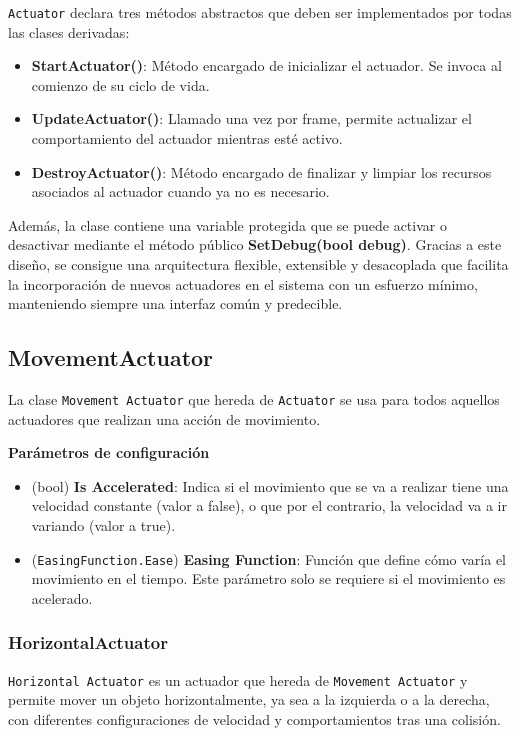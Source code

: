 \texttt{Actuator} declara tres métodos abstractos que deben ser implementados por todas las clases derivadas:

\begin{itemize}
\item \textbf{StartActuator()}: Método encargado de inicializar el actuador. Se invoca al comienzo de su ciclo de vida.
\item \textbf{UpdateActuator()}: Llamado una vez por frame, permite actualizar el comportamiento del actuador mientras esté activo.
\item \textbf{DestroyActuator()}: Método encargado de finalizar y limpiar los recursos asociados al actuador cuando ya no es necesario.
\end{itemize}

Además, la clase contiene una variable protegida que se puede activar o desactivar mediante el método público \textbf{SetDebug(bool debug)}.
Gracias a este diseño, se consigue una arquitectura flexible, extensible y desacoplada que facilita la incorporación de nuevos actuadores en el sistema con un esfuerzo mínimo, manteniendo siempre una interfaz común y predecible.

\subsection{MovementActuator}
La clase \texttt{Movement Actuator} que hereda de \texttt{Actuator} se usa para todos aquellos actuadores que realizan una acción de movimiento.

\textbf{Parámetros de configuración}
\begin{itemize}
	\item (bool) \textbf{Is Accelerated}: Indica si el movimiento que se va a realizar tiene una velocidad constante (valor a false), o que por el contrario, la velocidad va a ir variando (valor a true).
	\item (\texttt{EasingFunction.Ease}) \textbf{Easing Function}: Función que define cómo varía el movimiento en el tiempo. Este parámetro solo se requiere si el movimiento es acelerado.
\end{itemize}

\subsubsection{HorizontalActuator}
\texttt{Horizontal Actuator} es un actuador que hereda de \texttt{Movement Actuator} y permite mover un objeto horizontalmente, ya sea a la izquierda o a la derecha, con diferentes configuraciones de velocidad y comportamientos tras una colisión.\\

